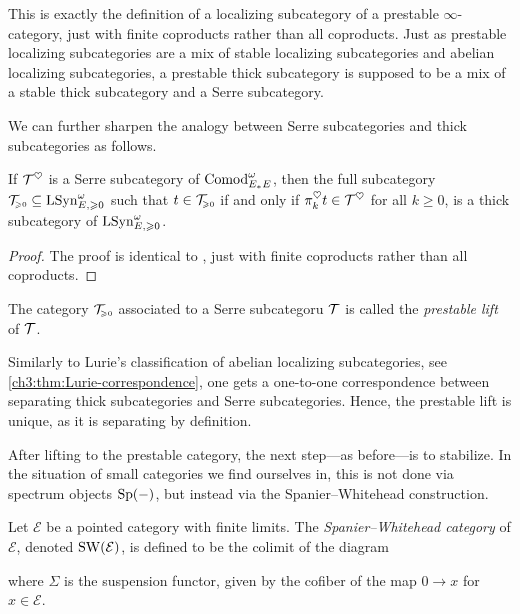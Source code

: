 \begin{remark}
    This is exactly the definition of a localizing subcategory of a prestable $\infty$-category, just with finite coproducts rather than all coproducts. Just as prestable localizing subcategories are a mix of stable localizing subcategories and abelian localizing subcategories, a prestable thick subcategory is supposed to be a mix of a stable thick subcategory and a Serre subcategory. 
\end{remark}

We can further sharpen the analogy between Serre subcategories and thick subcategories as follows. 

\begin{lemma}
    If $\mathcal{T}^\heartsuit$ is a Serre subcategory of $\mathrm{Comod}_{E_*E}^\omega$, then the full subcategory $\mathcal{T}_{\hspace{-1pt}\scriptscriptstyle\geqslant 0}\subseteq \mathrm{LSyn}_{E, \geqslant 0}^\omega$ such that $t\in \mathcal{T}_{\hspace{-1pt}\scriptscriptstyle\geqslant 0}$ if and only if $\pi^\heartsuit_k t \in \mathcal{T}^\heartsuit$ for all $k\geq 0$, is a thick subcategory of $\mathrm{LSyn}_{E, \geqslant 0}^\omega$. 
\end{lemma}
\begin{proof}
    The proof is identical to \cite[C.5.2.7]{lurie_SAG}, just with finite coproducts rather than all coproducts. 
\end{proof}

\begin{definition}
    The category $\mathcal{T}_{\hspace{-1pt}\scriptscriptstyle\geqslant 0}$ associated to a Serre subcategoru $\mathcal{T}$ is called the \emph{prestable lift} of $\mathcal{T}$. 
\end{definition}

\begin{remark}
    Similarly to Lurie's classification of abelian localizing subcategories, see \cref{ch3:thm:Lurie-correspondence}, one gets a one-to-one correspondence between separating thick subcategories and Serre subcategories. Hence, the prestable lift is unique, as it is separating by definition. 
\end{remark}

After lifting to the prestable category, the next step---as before---is to stabilize. In the situation of small categories we find ourselves in, this is not done via spectrum objects $\mathrm{Sp}(-)$, but instead via the Spanier--Whitehead construction. 

\begin{definition}
    Let $\mathcal{E}$ be a pointed category with finite limits. The \emph{Spanier--Whitehead category} of $\mathcal{E}$, denoted $\operatorname{SW}(\mathcal{E})$, is defined to be the colimit of the diagram 
    \begin{center}
    \end{center}
    where $\Sigma$ is the suspension functor, given by the cofiber of the map $0\rightarrow x$ for $x\in \mathcal{E}$. 
\end{definition}

